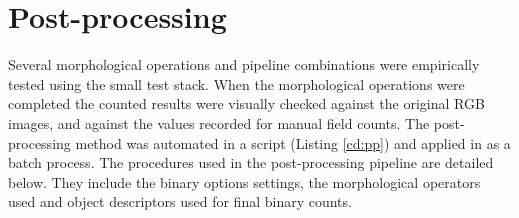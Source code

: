 \section{Post-processing}\label{sec:post-processing}

Several morphological operations and pipeline combinations were empirically tested using the small test stack. When the morphological operations were completed the counted results were visually checked against the original \ac{RGB} images, and against the values recorded for manual field counts. The post-processing method was automated in a script (Listing \ref{cd:pp}) and applied in as a batch process. The procedures used in the post-processing pipeline are detailed below. They include the binary options settings, the morphological operators used and object descriptors used for final binary counts. 

